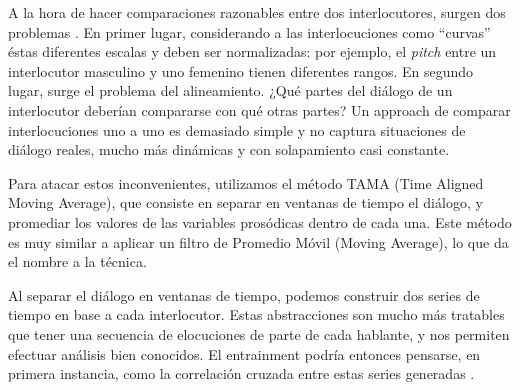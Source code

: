 
A la hora de hacer comparaciones razonables entre dos interlocutores, surgen dos problemas \cite{KOU2008}. En primer lugar, considerando a las interlocuciones como ``curvas'' éstas diferentes escalas y deben ser normalizadas: por ejemplo, el \emph{pitch} entre un interlocutor masculino y uno femenino tienen diferentes rangos. En segundo lugar, surge el problema del alineamiento. ¿Qué partes del diálogo de un interlocutor deberían compararse con qué otras partes? Un approach de comparar interlocuciones uno a uno es demasiado simple y no captura situaciones de diálogo reales, mucho más dinámicas y con solapamiento casi constante.

Para atacar estos inconvenientes, utilizamos el método TAMA (Time Aligned Moving Average), que consiste en separar en ventanas de tiempo el diálogo, y promediar los valores de las variables prosódicas dentro de cada una. Este método es muy similar a aplicar un filtro de Promedio Móvil (Moving Average), lo que da el nombre a la técnica.


Al separar el diálogo en ventanas de tiempo, podemos construir dos series de tiempo en base a cada interlocutor. Estas abstracciones son mucho más tratables que tener una secuencia de elocuciones de parte de cada hablante, y nos permiten efectuar análisis bien conocidos. El entrainment podría entonces pensarse, en primera instancia, como la correlación cruzada entre estas series generadas \cite{CHATFIELD}.


